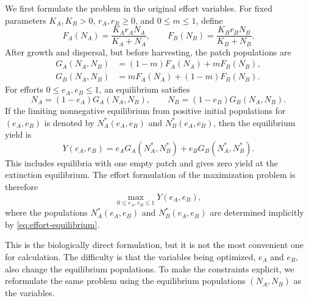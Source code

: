 \documentclass{article}
\numberwithin{equation}{section}
\begin{document}
We first formulate the problem in the original effort variables. For fixed
parameters $K_A,K_B>0$, $r_A,r_B\geq0$, and $0\leq m\leq1$, define
\begin{equation}
    \label{eq:growth-functions}
    F_A(N_A)=\frac{K_A r_A N_A}{K_A+N_A},
    \qquad
    F_B(N_B)=\frac{K_B r_B N_B}{K_B+N_B}.
\end{equation}
After growth and dispersal, but before harvesting, the patch populations are
\begin{equation}
    \label{eq:preharvest-growth}
    \begin{aligned}
    G_A(N_A,N_B)&=(1-m)F_A(N_A)+mF_B(N_B),\\
    G_B(N_A,N_B)&=mF_A(N_A)+(1-m)F_B(N_B).
    \end{aligned}
\end{equation}
For efforts $0\leq e_A,e_B\leq1$, an equilibrium satisfies
\begin{equation}
    \label{eq:effort-equilibrium}
    N_A=(1-e_A)G_A(N_A,N_B),
    \qquad
    N_B=(1-e_B)G_B(N_A,N_B).
\end{equation}
If the limiting nonnegative equilibrium from positive initial populations
for $(e_A,e_B)$ is denoted by
$N_A^*(e_A,e_B)$ and $N_B^*(e_A,e_B)$, then the equilibrium yield is
\begin{equation}
    \label{eq:effort-yield}
    Y(e_A,e_B)
    =
    e_A G_A(N_A^*,N_B^*)
    +
    e_B G_B(N_A^*,N_B^*).
\end{equation}
This includes equilibria with one empty patch and gives zero yield at
the extinction equilibrium.
The effort formulation of the maximization problem is therefore
\begin{equation}
    \label{eq:effort-maximization-problem}
    \max_{0\leq e_A,e_B\leq1} Y(e_A,e_B),
\end{equation}
where the populations $N_A^*(e_A,e_B)$ and $N_B^*(e_A,e_B)$ are determined
implicitly by \eqref{eq:effort-equilibrium}.

This is the biologically direct formulation, but it is not the most
convenient one for calculation. The difficulty is that the variables being
optimized, $e_A$ and $e_B$, also change the equilibrium populations. To make
the constraints explicit, we reformulate the same problem using the
equilibrium populations $(N_A,N_B)$ as the variables.
\end{document}
